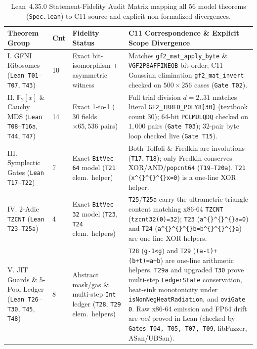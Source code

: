 \documentclass[11pt,reqno]{amsart}
\theoremstyle{plain}
\theoremstyle{definition}
\theoremstyle{remark}
\newcommand{\tcode}[1]{{\scriptsize\nolinkurl{#1}}}
\begin{document}
\begin{table}[t]
\centering
\caption{Lean~4.35.0 Statement-Fidelity Audit Matrix mapping all $56$ model theorems (\tcode{Spec.lean}) to C11 source and explicit non-formalized divergences.}
\label{tab:fidelity}
\scriptsize
\renewcommand{\arraystretch}{1.15}
\begin{tabularx}{\textwidth}{@{}P{2.65cm}P{0.55cm}P{2.60cm}Y@{}}
\toprule
\textbf{Theorem Group} & \textbf{Cnt} & \textbf{Fidelity Status} & \textbf{C11 Correspondence \& Explicit Scope Divergence} \\
\midrule
I. GFNI Ribosomes (\tcode{Lean T01}--\tcode{T07}, \tcode{T43}) & 10 & Exact bit-isomorphism + asymmetric witness & Matches \tcode{gf2_mat_apply_byte} \& \tcode{VGF2P8AFFINEQB} bit order; C11 Gaussian elimination \tcode{gf2_mat_invert} checked on $500\times 256$ cases (\tcode{Gate T02}). \\
II. $\mathbb{F}_2[x]$ \& Cauchy MDS (\tcode{Lean T08}--\tcode{T16a}, \tcode{T44}, \tcode{T47}) & 14 & Exact 1-to-1 ($30$ fields $\times 65{,}536$ pairs) & Full trial division $d=2..31$ matches literal \tcode{GF2_IRRED_POLY8[30]} (textbook count $30$); 64-bit \tcode{PCLMULQDQ} checked on $1{,}000$ pairs (\tcode{Gate T03}); 32-pair byte loop checked live (\tcode{Gate T15}). \\
III. Symplectic Gates (\tcode{Lean T17}--\tcode{T22}) & 7 & Exact \tcode{BitVec 64} model (\tcode{T21} elem.\ helper) & Both Toffoli \& Fredkin are involutions (\tcode{T17}, \tcode{T18}); only Fredkin conserves XOR/AND/\tcode{popcnt64} (\tcode{T19}--\tcode{T20a}). \tcode{T21} (\tcode{x\^{}\^{}\^{}x=0}) is a one-line XOR helper. \\
IV. 2-Adic \tcode{TZCNT} (\tcode{Lean T23}--\tcode{T25a}) & 4 & Exact \tcode{BitVec 32} model (\tcode{T23}, \tcode{T24} elem.\ helpers) & \tcode{T25}/\tcode{T25a} carry the ultrametric triangle content matching x86-64 \tcode{TZCNT} (\tcode{tzcnt32(0)=32}); \tcode{T23} (\tcode{a\^{}\^{}\^{}a=0}) and \tcode{T24} (\tcode{a\^{}\^{}\^{}b=b\^{}\^{}\^{}a}) are one-line XOR helpers. \\
V. JIT Guards \& 5-Pool Ledger (\tcode{Lean T26}--\tcode{T30}, \tcode{T45}, \tcode{T48}) & 8 & Abstract mask/gas \& multi-step \tcode{Int} ledger (\tcode{T28}, \tcode{T29} elem.\ helpers) & \tcode{T28} (\tcode{g-1<g}) and \tcode{T29} (\tcode{(a-t)+(b+t)=a+b}) are one-line arithmetic helpers. \tcode{T29a} and upgraded \tcode{T30} prove multi-step \tcode{LedgerState} conservation, heat-sink monotonicity under \tcode{isNonNegHeatRadiation}, and \tcode{oviGate 0}. Raw x86-64 emission and FP64 drift are \emph{not} proved in Lean (checked by \tcode{Gates T04, T05, T07, T09}, libFuzzer, ASan/UBSan). \\

\end{tabularx}
\end{table}
\end{document}

